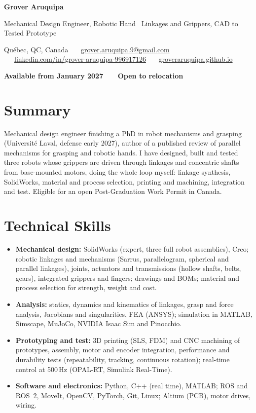 \documentclass[10pt,letterpaper]{article}
\begin{document}
{\LARGE\bfseries Grover Aruquipa}\par\vspace{2pt}
{\large Mechanical Design Engineer, Robotic Hand \textbar\ Linkages and Grippers, CAD to Tested Prototype}\par\vspace{3pt}
{\small Qu\'ebec, QC, Canada \ \textbullet\ \
\href{mailto:grover.aruquipa.9@gmail.com}{grover.aruquipa.9@gmail.com} \ \textbullet\ \
\href{https://www.linkedin.com/in/grover-aruquipa-996917126}{linkedin.com/in/grover-aruquipa-996917126} \ \textbullet\ \
\href{https://groveraruquipa.github.io}{groveraruquipa.github.io}}\par\vspace{1pt}
{\small\bfseries Available from January 2027 \ \textbullet\ \ Open to relocation}\par


\section{Summary}
Mechanical design engineer finishing a PhD in robot mechanisms and grasping (Universit\'e Laval, defense early 2027),
author of a published review of parallel mechanisms for grasping and robotic hands. I have designed, built and tested three
robots whose grippers are driven through linkages and concentric shafts from base-mounted motors, doing the whole loop
myself: linkage synthesis, SolidWorks, material and process selection, printing and machining, integration and test.
Eligible for an open Post-Graduation Work Permit in Canada.

\section{Technical Skills}
\begin{itemize}
\item \textbf{Mechanical design:} SolidWorks (expert, three full robot assemblies), Creo; robotic linkages and mechanisms
(Sarrus, parallelogram, spherical and parallel linkages), joints, actuators and transmissions (hollow shafts,
belts, gears), integrated grippers and fingers; drawings and BOMs; material and process selection for
strength, weight and cost.
\item \textbf{Analysis:} statics, dynamics and kinematics of linkages, grasp and force analysis, Jacobians and singularities,
FEA (ANSYS); simulation in MATLAB, Simscape, MuJoCo, NVIDIA Isaac Sim and Pinocchio.
\item \textbf{Prototyping and test:} 3D printing (SLS, FDM) and CNC machining of prototypes, assembly, motor and encoder
integration, performance and durability tests (repeatability, tracking, continuous rotation); real-time control at
500\,Hz (OPAL-RT, Simulink Real-Time).
\item \textbf{Software and electronics:} Python, C++ (real time), MATLAB; ROS and ROS~2, MoveIt, OpenCV, PyTorch, Git,
Linux; Altium (PCB), motor drives, wiring.
\end{itemize}
\end{document}
